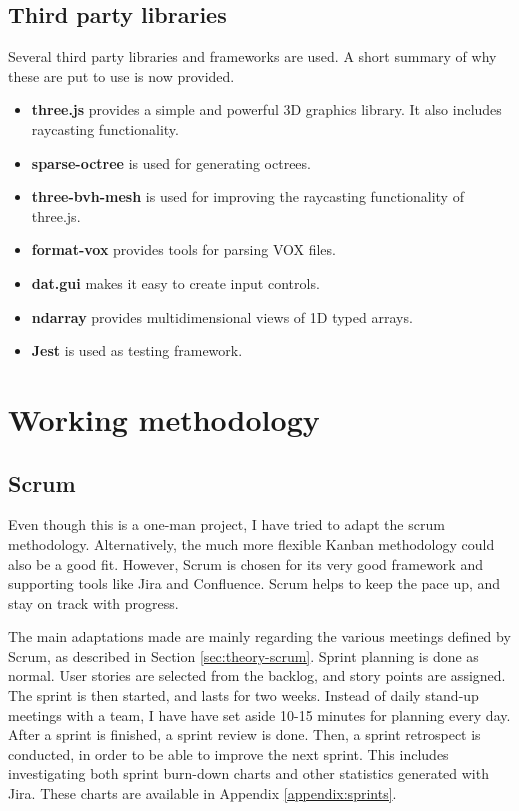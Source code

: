 \subsection{Third party libraries}
Several third party libraries and frameworks are used. A short summary of why these are put to use is now provided.
\begin{itemize}
    \item \textbf{three.js} provides a simple and powerful 3D graphics library. It also includes raycasting functionality.
    \item \textbf{sparse-octree} is used for generating octrees.
    \item \textbf{three-bvh-mesh} is used for improving the raycasting functionality of three.js.
    \item \textbf{format-vox} provides tools for parsing VOX files.
    \item \textbf{dat.gui} makes it easy to create input controls.
    \item \textbf{ndarray} provides multidimensional views of 1D typed arrays.
    \item \textbf{Jest} is used as testing framework.
\end{itemize}

\section{Working methodology}
\subsection{Scrum}
Even though this is a one-man project, I have tried to adapt the scrum methodology. Alternatively, the much more flexible Kanban methodology could also be a good fit. However, Scrum is chosen for its very good framework and supporting tools like Jira and Confluence. Scrum helps to keep the pace up, and stay on track with progress.

The main adaptations made are mainly regarding the various meetings defined by Scrum, as described in Section \ref{sec:theory-scrum}. Sprint planning is done as normal. User stories are selected from the backlog, and story points are assigned. The sprint is then started, and lasts for two weeks. Instead of daily stand-up meetings with a team, I have have set aside 10-15 minutes for planning every day. After a sprint is finished, a sprint review is done. Then, a sprint retrospect is conducted, in order to be able to improve the next sprint. This includes investigating both sprint burn-down charts and other statistics generated with Jira. These charts are available in Appendix \ref{appendix:sprints}.

